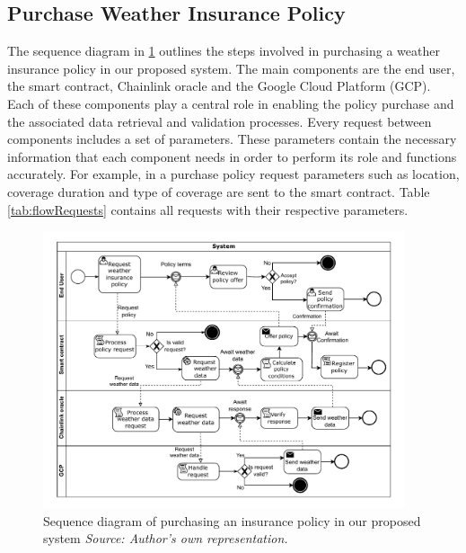 \subsection{Purchase Weather Insurance Policy}\label{subsection:purchasePolicyFlow}

The sequence diagram in \cref{fig:purchasePolicyFlow} outlines the steps involved in purchasing a weather insurance policy in our proposed system. The main components are the end user, the smart contract, Chainlink oracle and the Google Cloud Platform (GCP). Each of these components play a central role in enabling the policy purchase and the associated data retrieval and validation processes. Every request between components includes a set of parameters. These parameters contain the necessary information that each component needs in order to perform its role and functions accurately. For example, in a purchase policy request parameters such as location, coverage duration and type of coverage are sent to the smart contract. Table \cref{tab:flowRequests} contains all requests with their respective parameters.

\begin{figure}[h]
    \centering
    \includegraphics[width=0.95\textwidth]{figures/flow-purchase-policy.drawio.pdf}
    \caption{Sequence diagram of purchasing an insurance policy in our proposed system \textit{Source: Author's own representation.}}
    \label{fig:purchasePolicyFlow}
\end{figure}

\begin{table}[h]
    \centering
    
    \caption{Requests in \cref{fig:purchasePolicyFlow} with their parameters \textit{Source: Author's own representation.}}
    \label{tab:flowRequests}
\end{table}

